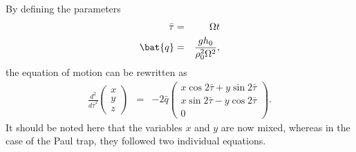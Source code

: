 \documentclass{article}
\begin{document}
By defining the parameters
\begin{eqnarray*}
\bar{\tau} & = & \Omega t \\
\bat{q} & = & \frac{gh_0}{\rho_0^2 \Omega^2},
\end{eqnarray*}
the equation of motion can be rewritten as
\begin{eqnarray*}
\frac{d^2}{d\bar{\tau}^2} \left(
\begin{array}{c}
	x \\
	y \\
	z
\end{array} \right) & = & -2\bar{q} \left(
\begin{array}{c}
	x \cos{2\bar{\tau}} + y \sin{2\bar{\tau}} \\
	x \sin{2\bar{\tau}} - y \cos{2\bar{\tau}} \\
	0
\end{array} \right).
\end{eqnarray*}
It should be noted here that the variables $x$ and $y$ are now mixed, whereas in the case of the Paul trap, they followed two individual equations. \\
\end{document}
